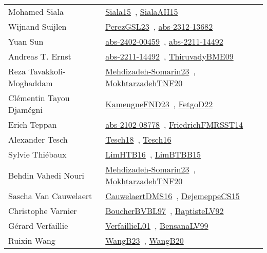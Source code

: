 {\begin{longtable}{p{4cm}p{20cm}}
Mohamed Siala & \href{works/Siala15.pdf}{Siala15}~\cite{Siala15}, \href{works/SialaAH15.pdf}{SialaAH15}~\cite{SialaAH15}\\
Wijnand Suijlen & \href{works/PerezGSL23.pdf}{PerezGSL23}~\cite{PerezGSL23}, \href{works/abs-2312-13682.pdf}{abs-2312-13682}~\cite{abs-2312-13682}\\
Yuan Sun & \href{works/abs-2402-00459.pdf}{abs-2402-00459}~\cite{abs-2402-00459}, \href{works/abs-2211-14492.pdf}{abs-2211-14492}~\cite{abs-2211-14492}\\
Andreas T. Ernst & \href{works/abs-2211-14492.pdf}{abs-2211-14492}~\cite{abs-2211-14492}, \href{works/ThiruvadyBME09.pdf}{ThiruvadyBME09}~\cite{ThiruvadyBME09}\\
Reza Tavakkoli{-}Moghaddam & \href{works/Mehdizadeh-Somarin23.pdf}{Mehdizadeh-Somarin23}~\cite{Mehdizadeh-Somarin23}, \href{works/MokhtarzadehTNF20.pdf}{MokhtarzadehTNF20}~\cite{MokhtarzadehTNF20}\\
Cl{\'{e}}mentin Tayou Djam{\'{e}}gni & \href{works/KameugneFND23.pdf}{KameugneFND23}~\cite{KameugneFND23}, \href{works/FetgoD22.pdf}{FetgoD22}~\cite{FetgoD22}\\
Erich Teppan & \href{works/abs-2102-08778.pdf}{abs-2102-08778}~\cite{abs-2102-08778}, \href{}{FriedrichFMRSST14}~\cite{FriedrichFMRSST14}\\
Alexander Tesch & \href{works/Tesch18.pdf}{Tesch18}~\cite{Tesch18}, \href{works/Tesch16.pdf}{Tesch16}~\cite{Tesch16}\\
Sylvie Thi{\'{e}}baux & \href{works/LimHTB16.pdf}{LimHTB16}~\cite{LimHTB16}, \href{works/LimBTBB15.pdf}{LimBTBB15}~\cite{LimBTBB15}\\
Behdin Vahedi Nouri & \href{works/Mehdizadeh-Somarin23.pdf}{Mehdizadeh-Somarin23}~\cite{Mehdizadeh-Somarin23}, \href{works/MokhtarzadehTNF20.pdf}{MokhtarzadehTNF20}~\cite{MokhtarzadehTNF20}\\
Sascha Van Cauwelaert & \href{works/CauwelaertDMS16.pdf}{CauwelaertDMS16}~\cite{CauwelaertDMS16}, \href{works/DejemeppeCS15.pdf}{DejemeppeCS15}~\cite{DejemeppeCS15}\\
Christophe Varnier & \href{}{BoucherBVBL97}~\cite{BoucherBVBL97}, \href{works/BaptisteLV92.pdf}{BaptisteLV92}~\cite{BaptisteLV92}\\
G{\'{e}}rard Verfaillie & \href{works/VerfaillieL01.pdf}{VerfaillieL01}~\cite{VerfaillieL01}, \href{works/BensanaLV99.pdf}{BensanaLV99}~\cite{BensanaLV99}\\
Ruixin Wang & \href{works/WangB23.pdf}{WangB23}~\cite{WangB23}, \href{works/WangB20.pdf}{WangB20}~\cite{WangB20}\\

\end{longtable}}
